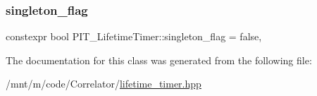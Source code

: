 \subsubsection{\texorpdfstring{singleton\+\_\+flag}{singleton\_flag}}
{\footnotesize\ttfamily constexpr bool P\+I\+T\+\_\+\+Lifetime\+Timer\+::singleton\+\_\+flag = false\hspace{0.3cm}{\ttfamily [static]}, {\ttfamily [private]}}



The documentation for this class was generated from the following file\+:\begin{DoxyCompactItemize}
\item 
/mnt/m/code/\+Correlator/\hyperlink{lifetime__timer_8hpp}{lifetime\+\_\+timer.\+hpp}\end{DoxyCompactItemize}
